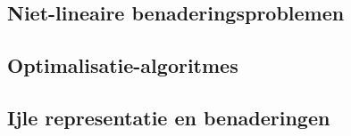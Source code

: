 \documentclass{exam} %
\begin{document}
\subsection{Niet-lineaire benaderingsproblemen}

\vspace{0.5cm}



\newpage

\subsection{Optimalisatie-algoritmes}

\vspace{0.5cm}



\newpage

\subsection{Ijle representatie en benaderingen}

\vspace{0.5cm}



\newpage
\end{document}

